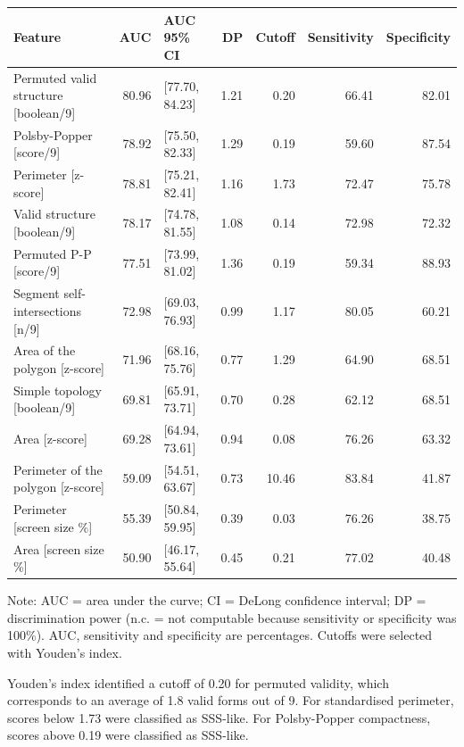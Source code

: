 \documentclass[
  man,
  floatsintext,
  longtable,
  nolmodern,
  notxfonts,
  notimes,
  colorlinks=true,linkcolor=blue,citecolor=blue,urlcolor=blue]{apa7}
\begin{document}
\begin{table}
\fontsize{12.0pt}{14.0pt}\selectfont
\begin{tabular*}{\linewidth}{@{\extracolsep{\fill}}lrlrrrr}
\toprule
Feature & AUC & AUC 95\% CI & DP & Cutoff & Sensitivity & Specificity \\ 
\midrule\addlinespace[2.5pt]
Permuted valid structure [boolean/9] & 80.96 & [77.70, 84.23] & 1.21 & 0.20 & 66.41 & 82.01 \\ 
Polsby-Popper [score/9] & 78.92 & [75.50, 82.33] & 1.29 & 0.19 & 59.60 & 87.54 \\ 
Perimeter [z-score] & 78.81 & [75.21, 82.41] & 1.16 & 1.73 & 72.47 & 75.78 \\ 
Valid structure [boolean/9] & 78.17 & [74.78, 81.55] & 1.08 & 0.14 & 72.98 & 72.32 \\ 
Permuted P-P [score/9] & 77.51 & [73.99, 81.02] & 1.36 & 0.19 & 59.34 & 88.93 \\ 
Segment self-intersections [n/9] & 72.98 & [69.03, 76.93] & 0.99 & 1.17 & 80.05 & 60.21 \\ 
Area of the polygon [z-score] & 71.96 & [68.16, 75.76] & 0.77 & 1.29 & 64.90 & 68.51 \\ 
Simple topology [boolean/9] & 69.81 & [65.91, 73.71] & 0.70 & 0.28 & 62.12 & 68.51 \\ 
Area [z-score] & 69.28 & [64.94, 73.61] & 0.94 & 0.08 & 76.26 & 63.32 \\ 
Perimeter of the polygon [z-score] & 59.09 & [54.51, 63.67] & 0.73 & 10.46 & 83.84 & 41.87 \\ 
Perimeter [screen size \%] & 55.39 & [50.84, 59.95] & 0.39 & 0.03 & 76.26 & 38.75 \\ 
Area [screen size \%] & 50.90 & [46.17, 55.64] & 0.45 & 0.21 & 77.02 & 40.48 \\ 
\bottomrule
\end{tabular*}
\begin{minipage}{\linewidth}
\vspace{.05em}
Note: AUC = area under the curve; CI = DeLong confidence interval; DP = discrimination power (n.c. = not computable because sensitivity or specificity was 100\%). AUC, sensitivity and specificity are percentages. Cutoffs were selected with Youden’s index.\\
\end{minipage}

\end{table}

Youden's index identified a cutoff of 0.20 for permuted validity, which
corresponds to an average of 1.8 valid forms out of 9. For standardised
perimeter, scores below 1.73 were classified as SSS-like. For
Polsby-Popper compactness, scores above 0.19 were classified as
SSS-like.
\end{document}
